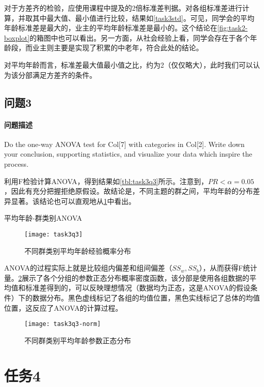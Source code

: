 \documentclass[a4paper,12pt]{article}
\begin{document}
    对于方差齐的检验，应使用课程中提及的2倍标准差判据。对各组标准差进行计算，并取其中最大值、最小值进行比较，结果如\cref{task3std}。可见，同学会的平均年龄标准差是最大的，业主的平均年龄标准差是最小的。这个结论在\cref{fig:task2-boxplot}的箱图中也可以看出。另一方面，从社会经验上看，同学会存在于各个年龄段，而业主则主要是实现了积累的中老年，符合此处的结论。
    

    对平均年龄而言，标准差最大值最小值之比，约为2（仅仅略大），此时我们可以认为该分部满足方差齐的条件。

    \subsection{问题3}
    \paragraph{问题描述} Do the one-way ANOVA test for Col[7] with categories in Col[2]. Write down your conclusion, supporting statistics, and visualize your data which inspire the process.

    利用F检验计算ANOVA，得到结果如\cref{tbl:task3q3}所示。注意到，$PR<\alpha=0.05$，因此有充分把握拒绝原假设。故结论是，不同主题的群之间，平均年龄的分布差异显著。该结论也可以直观地从\cref{fig:task3q3}中看出。
    \begin{table}
      \centering
      \caption{平均年龄-群类别ANOVA}
      \label{tbl:task3q3}
      
    \end{table}
    \begin{figure}
      \centering
      \texttt{[image: task3q3]}
      \caption{不同群类别平均年龄经验概率分布}
      \label{fig:task3q3}
    \end{figure}

    ANOVA的过程实际上就是比较组内偏差和组间偏差（$SS_w, SS_b$），从而获得F统计量。\cref{fig:task3q3-norm}展示了各个分组的参数正态分布概率密度函数，该分部是使用各组数据的平均值和标准差得到的，可以反映理想情况（数据均为正态，这是ANOVA的假设条件）下的数据分布。黑色虚线标记了各组的均值位置，黑色实线标记了总体的均值位置，这反应了ANOVA的计算过程。
    \begin{figure}
      \centering
      \texttt{[image: task3q3-norm]}
      \caption{不同群类别平均年龄参数正态分布}
      \label{fig:task3q3-norm}
    \end{figure}

    \section{任务4} %
\end{document}
